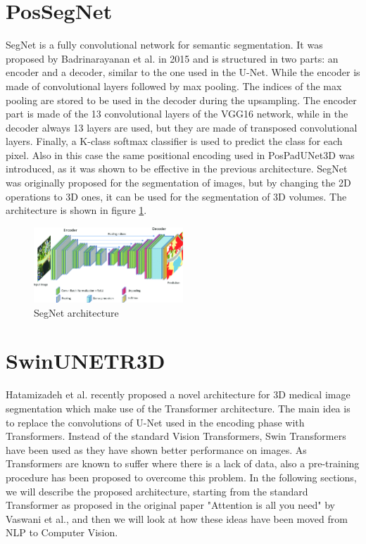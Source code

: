 \section{PosSegNet}
SegNet is a fully convolutional network for semantic segmentation. It was
proposed by Badrinarayanan et al. in 2015 and is structured in two parts: an
encoder and a decoder, similar to the one used in the U-Net. While the encoder
is made of convolutional layers followed by max pooling. The indices of the
max pooling are stored to be used in the decoder during the upsampling.
The encoder part is made of the 13 convolutional layers of the VGG16 network,
while in the decoder always 13 layers are used, but they are made of transposed
convolutional layers. Finally, a K-class softmax classifier is used to predict
the class for each pixel.
Also in this case the same positional encoding used in PosPadUNet3D was
introduced, as it was shown to be effective in the previous architecture.
SegNet was originally proposed for the segmentation of images, but by changing
the 2D operations to 3D ones, it can be used for the segmentation of 3D volumes.
The architecture is shown in figure \ref{fig:segnet}.
\begin{figure}[h]
  \centering
  \includegraphics[width=0.5\textwidth]{Images/segnet.png}
  \caption{SegNet architecture}
  \label{fig:segnet}
\end{figure}

\section{SwinUNETR3D}
Hatamizadeh et al. recently proposed a novel architecture for 3D medical image
segmentation which make use of the Transformer architecture. The main idea is to
replace the convolutions of U-Net used in the encoding phase with Transformers.
Instead of the standard Vision Transformers, Swin Transformers have been used as
they have shown better performance on images. As Transformers are known to
suffer where there is a lack of data, also a pre-training procedure has been
proposed to overcome this problem. In the following sections, we will describe
the proposed architecture, starting from the standard Transformer as proposed in
the original paper "Attention is all you need" by Vaswani et al., and then we
will look at how these ideas have been moved from NLP to Computer Vision.

